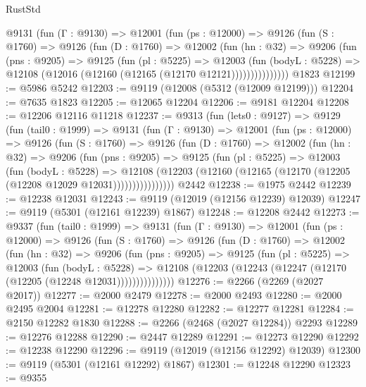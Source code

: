 \begin{lexlean}{RustStd}
\begin{coremodule}
        @9131
          (fun (Γ : @9130) =>
          @12001
            (fun (ps : @12000) =>
            @9126
              (fun (S : @1760) =>
              @9126
                (fun (D : @1760) =>
                @12002
                  (fun (hn : @32) =>
                  @9206
                    (fun (pns : @9205) =>
                    @9125
                      (fun (pl : @5225) =>
                      @12003
                        (fun (bodyL : @5228) =>
                        @12108 (@12016 (@12160 (@12165 (@12170 @12121)))))))))))))))
    @1823
@12199 := @5986 @5242
@12203 := @9119 (@12008 (@5312 (@12009 @12199)))
@12204 := @7635 @1823
@12205 := @12065 @12204
@12206 := @9181 @12204
@12208 := @12206 @12116 @11218
@12237 := @9313
    (fun (lets0 : @9127) =>
    @9129
      (fun (tail0 : @1999) =>
      @9131
        (fun (Γ : @9130) =>
        @12001
          (fun (ps : @12000) =>
          @9126
            (fun (S : @1760) =>
            @9126
              (fun (D : @1760) =>
              @12002
                (fun (hn : @32) =>
                @9206
                  (fun (pns : @9205) =>
                  @9125
                    (fun (pl : @5225) =>
                    @12003
                      (fun (bodyL : @5228) =>
                      @12108
                        (@12203
                          (@12160 (@12165 (@12170 (@12205 (@12208 @12029 @12031))))))))))))))))
    @2442
@12238 := @1975 @2442
@12239 := @12238 @12031
@12243 := @9119 (@12019 (@12156 @12239) @12039)
@12247 := @9119 (@5301 (@12161 @12239) @1867)
@12248 := @12208 @2442
@12273 := @9337
    (fun (tail0 : @1999) =>
    @9131
      (fun (Γ : @9130) =>
      @12001
        (fun (ps : @12000) =>
        @9126
          (fun (S : @1760) =>
          @9126
            (fun (D : @1760) =>
            @12002
              (fun (hn : @32) =>
              @9206
                (fun (pns : @9205) =>
                @9125
                  (fun (pl : @5225) =>
                  @12003
                    (fun (bodyL : @5228) =>
                    @12108 (@12203 (@12243 (@12247 (@12170 (@12205 (@12248 @12031)))))))))))))))
@12276 := @2266 (@2269 (@2027 @2017))
@12277 := @2000 @2479
@12278 := @2000 @2493
@12280 := @2000 @2495 @2004
@12281 := @12278 @12280
@12282 := @12277 @12281
@12284 := @2150 @12282 @1830
@12288 := @2266 (@2468 (@2027 @12284)) @2293
@12289 := @12276 @12288
@12290 := @2447 @12289
@12291 := @12273 @12290
@12292 := @12238 @12290
@12296 := @9119 (@12019 (@12156 @12292) @12039)
@12300 := @9119 (@5301 (@12161 @12292) @1867)
@12301 := @12248 @12290
@12323 := @9355

\end{coremodule}
\end{lexlean}

